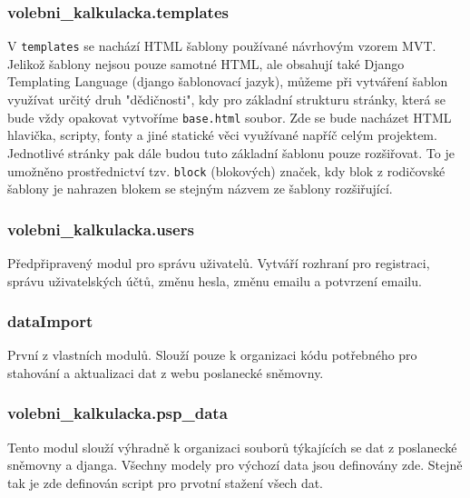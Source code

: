 \subsubsection{volebni\_kalkulacka.templates}
\par V \texttt{templates} se nachází HTML šablony používané návrhovým vzorem MVT. Jelikož šablony nejsou pouze samotné HTML, ale obsahují také Django Templating Language (django šablonovací jazyk), můžeme při vytváření šablon využívat určitý druh "dědičnosti", kdy pro základní strukturu stránky, která se bude vždy opakovat vytvoříme \texttt{base.html} soubor. Zde se bude nacházet HTML hlavička, scripty, fonty a jiné statické věci využívané napříč celým projektem. Jednotlivé stránky pak dále budou tuto základní šablonu pouze rozšiřovat. To je umožněno prostřednictví tzv. \texttt{block} (blokových) značek, kdy blok z rodičovské šablony je nahrazen blokem se stejným názvem ze šablony rozšiřující.

\subsubsection{volebni\_kalkulacka.users}
Předpřipravený modul pro správu uživatelů. Vytváří rozhraní pro registraci, správu uživatelských účtů, změnu hesla, změnu emailu a potvrzení emailu.
 
\subsubsection{dataImport}
První z vlastních modulů. Slouží pouze k organizaci kódu potřebného pro stahování a aktualizaci dat z webu poslanecké sněmovny. 

\subsubsection{volebni\_kalkulacka.psp\_data}
Tento modul slouží výhradně k organizaci souborů týkajících se dat z poslanecké sněmovny a djanga. Všechny modely pro výchozí data jsou definovány zde. Stejně tak je zde definován script pro prvotní stažení všech dat.


